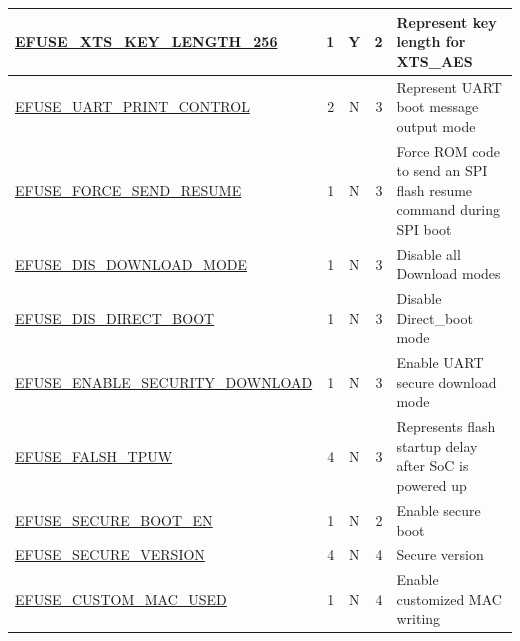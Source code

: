 \begin{longtable}[l]{ |m{7.5cm}|r|c|r|m{10cm}| }
    \hline
    \hyperref[fielddesc:EFUSEXTSKEYLENGTH256]{EFUSE\_XTS\_KEY\_LENGTH\_256}  & 1 & Y & 2  & Represent key length for XTS\_AES\\
    \hline
    \hyperref[fielddesc:EFUSEUARTPRINTCONTROL]{EFUSE\_UART\_PRINT\_CONTROL}  & 2 & N & 3 & Represent UART boot message output mode\\   
    \hline
    \hyperref[fielddesc:EFUSEFORCESENDRESUME]{EFUSE\_FORCE\_SEND\_RESUME} & 1 & N & 3 & Force ROM code to send an SPI flash resume command during SPI boot \\ 
    \hline    
    \hyperref[fielddesc:EFUSEDISDOWNLOADMODE]{EFUSE\_DIS\_DOWNLOAD\_MODE}  & 1 & N & 3 & Disable all Download modes\\    
    \hline
    \hyperref[fielddesc:EFUSEDISDIRECTBOOT]{EFUSE\_DIS\_DIRECT\_BOOT} & 1 & N & 3 & Disable Direct\_boot mode\\ 
    \hline
    \hyperref[fielddesc:EFUSEENABLESECURITYDOWNLOAD]{EFUSE\_ENABLE\_SECURITY\_DOWNLOAD} & 1 & N & 3 & Enable UART secure download mode \\
    \hline
    \hyperref[fielddesc:EFUSEFLASHTPUW]{EFUSE\_FALSH\_TPUW} & 4 & N & 3 & Represents flash startup delay after SoC is powered up\\
    \hline
    \hyperref[fielddesc:EFUSESECUREBOOTEN]{EFUSE\_SECURE\_BOOT\_EN} & 1 & N & 2 & Enable secure boot\\
    \hline
    \hyperref[fielddesc:EFUSESECUREVERSION]{EFUSE\_SECURE\_VERSION} & 4 & N & 4 & Secure version\\
    \hline
    \hyperref[fielddesc:EFUSECUSTOMMACUSED]{EFUSE\_CUSTOM\_MAC\_USED} & 1 & N & 4 & Enable customized MAC writing \\    
    \hline    
\end{longtable}
